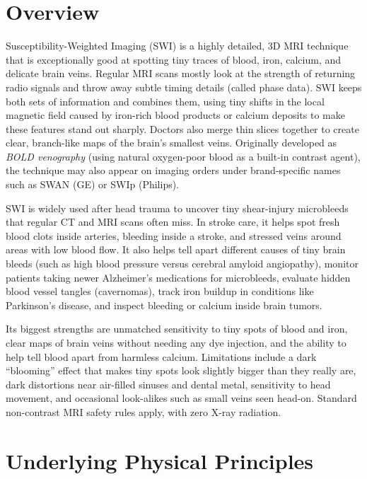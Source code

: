 \label{ch:infographic-swi}

\section{Overview}

Susceptibility-Weighted Imaging (SWI) is a highly detailed, 3D MRI technique that is exceptionally good at spotting tiny traces of blood, iron, calcium, and delicate brain veins. Regular MRI scans mostly look at the strength of returning radio signals and throw away subtle timing details (called phase data). SWI keeps both sets of information and combines them, using tiny shifts in the local magnetic field caused by iron-rich blood products or calcium deposits to make these features stand out sharply. Doctors also merge thin slices together to create clear, branch-like maps of the brain's smallest veins. Originally developed as \textit{BOLD venography} (using natural oxygen-poor blood as a built-in contrast agent), the technique may also appear on imaging orders under brand-specific names such as SWAN (GE) or SWIp (Philips).

SWI is widely used after head trauma to uncover tiny shear-injury microbleeds that regular CT and MRI scans often miss. In stroke care, it helps spot fresh blood clots inside arteries, bleeding inside a stroke, and stressed veins around areas with low blood flow. It also helps tell apart different causes of tiny brain bleeds (such as high blood pressure versus cerebral amyloid angiopathy), monitor patients taking newer Alzheimer's medications for microbleeds, evaluate hidden blood vessel tangles (cavernomas), track iron buildup in conditions like Parkinson's disease, and inspect bleeding or calcium inside brain tumors.

Its biggest strengths are unmatched sensitivity to tiny spots of blood and iron, clear maps of brain veins without needing any dye injection, and the ability to help tell blood apart from harmless calcium. Limitations include a dark ``blooming'' effect that makes tiny spots look slightly bigger than they really are, dark distortions near air-filled sinuses and dental metal, sensitivity to head movement, and occasional look-alikes such as small veins seen head-on. Standard non-contrast MRI safety rules apply, with zero X-ray radiation.

\section{Underlying Physical Principles}

